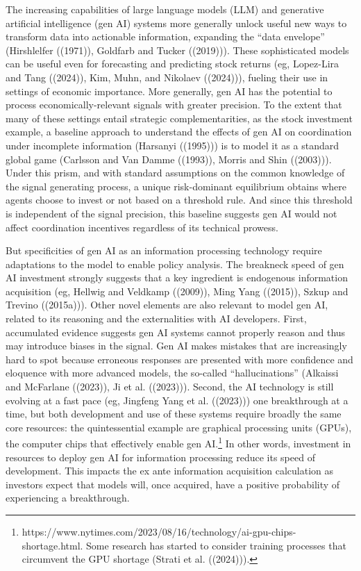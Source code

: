 \documentclass[
]{article}
\theoremstyle{plain}
\theoremstyle{definition}
\theoremstyle{remark}
\begin{document}
The increasing capabilities of large language models (LLM) and
generative artificial intelligence (gen AI) systems more generally
unlock useful new ways to transform data into actionable information,
expanding the ``data envelope'' (Hirshlelfer ((1971)), Goldfarb and
Tucker ((2019))). These sophisticated models can be useful even for
forecasting and predicting stock returns (eg, Lopez-Lira and Tang
((2024)), Kim, Muhn, and Nikolaev ((2024))), fueling their use in
settings of economic importance. More generally, gen AI has the
potential to process economically-relevant signals with greater
precision. To the extent that many of these settings entail strategic
complementarities, as the stock investment example, a baseline approach
to understand the effects of gen AI on coordination under incomplete
information (Harsanyi ((1995))) is to model it as a standard global game
(Carlsson and Van Damme ((1993)), Morris and Shin ((2003))). Under this
prism, and with standard assumptions on the common knowledge of the
signal generating process, a unique risk-dominant equilibrium obtains
where agents choose to invest or not based on a threshold rule. And
since this threshold is independent of the signal precision, this
baseline suggests gen AI would not affect coordination incentives
regardless of its technical prowess.

But specificities of gen AI as an information processing technology
require adaptations to the model to enable policy analysis. The
breakneck speed of gen AI investment strongly suggests that a key
ingredient is endogenous information acquisition (eg, Hellwig and
Veldkamp ((2009)), Ming Yang ((2015)), Szkup and Trevino ((2015a))).
Other novel elements are also relevant to model gen AI, related to its
reasoning and the externalities with AI developers. First, accumulated
evidence suggests gen AI systems cannot properly reason and thus may
introduce biases in the signal. Gen AI makes mistakes that are
increasingly hard to spot because erroneous responses are presented with
more confidence and eloquence with more advanced models, the so-called
``hallucinations'' (Alkaissi and McFarlane ((2023)), Ji et al.
((2023))). Second, the AI technology is still evolving at a fast pace
(eg, Jingfeng Yang et al. ((2023))) one breakthrough at a time, but both
development and use of these systems require broadly the same core
resources: the quintessential example are graphical processing units
(GPUs), the computer chips that effectively enable gen AI.\footnote{https://www.nytimes.com/2023/08/16/technology/ai-gpu-chips-shortage.html.
  Some research has started to consider training processes that
  circumvent the GPU shortage (Strati et al. ((2024))).} In other words,
investment in resources to deploy gen AI for information processing
reduce its speed of development. This impacts the ex ante information
acquisition calculation as investors expect that models will, once
acquired, have a positive probability of experiencing a breakthrough.
\end{document}
